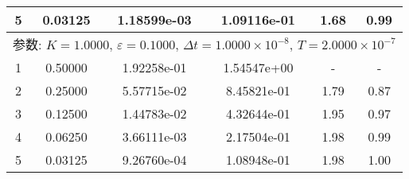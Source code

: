 \documentclass[12pt,a4paper]{article}
\begin{document}
\begin{table}[h]
{\begin{tabular}{c c c c c c}
			5 & 0.03125 & 1.18599e-03 & 1.09116e-01 & 1.68  & 0.99  \\
			\midrule
			\multicolumn{6}{c}{参数: $K = 1.0000$, $\varepsilon = 0.1000$, $\Delta t = 1.0000 \times 10^{-8}$, $T = 2.0000 \times 10^{-7}$} \\
			\midrule
			1 & 0.50000 & 1.92258e-01 & 1.54547e+00 & -     & -     \\ 
			2 & 0.25000 & 5.57715e-02 & 8.45821e-01 & 1.79  & 0.87  \\ 
			3 & 0.12500 & 1.44783e-02 & 4.32644e-01 & 1.95  & 0.97  \\ 
			4 & 0.06250 & 3.66111e-03 & 2.17504e-01 & 1.98  & 0.99  \\ 
			5 & 0.03125 & 9.26760e-04 & 1.08948e-01 & 1.98  & 1.00  \\
			\bottomrule
	\end{tabular}}
\end{table}
\end{document}
